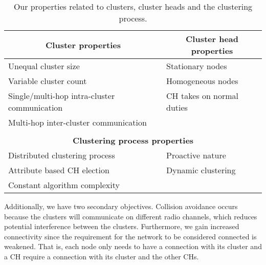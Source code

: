 \begin{table}[bt]
\centering
\caption{Our properties related to clusters, cluster heads and the clustering process.}
\label{table:clustering-design-properties}
\begin{tabular}{ll}
\multicolumn{1}{c}{\textbf{Cluster properties}}             & \multicolumn{1}{c}{\textbf{Cluster head properties}} \\ \hline
\multicolumn{1}{l|}{Unequal cluster size}                   & Stationary nodes                                     \\
\multicolumn{1}{l|}{Variable cluster count}                 & Homogeneous nodes                                    \\
\multicolumn{1}{l|}{Single/multi-hop intra-cluster communication} & CH takes on normal duties                            \\
\multicolumn{1}{l|}{Multi-hop inter-cluster communication}  & \textbf{}                                            \\
                                                            &                                                      \\
\multicolumn{2}{c}{\textbf{Clustering process properties}}                                                         \\ \hline
Distributed clustering process                              & Proactive nature                                     \\
Attribute based CH election                                 & Dynamic clustering                                   \\
Constant algorithm complexity                               &                                                     
\end{tabular}
\end{table}

Additionally, we have two secondary objectives. Collision avoidance occurs because the clusters will communicate on different radio channels, which reduces potential interference between the clusters. Furthermore, we gain increased connectivity since the requirement for the network to be considered connected is weakened. That is, each node only needs to have a connection with its cluster and a CH require a connection with its cluster and the other CHs.


